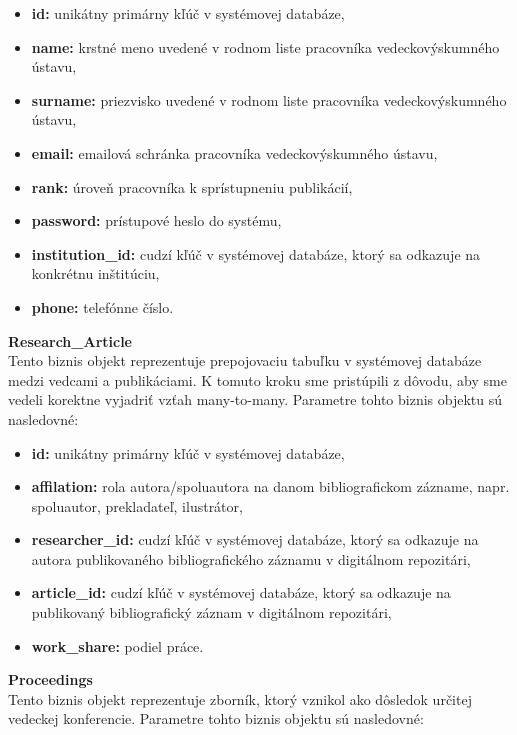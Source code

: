 \documentclass[10pt,oneside,slovak,a4paper]{article}
\begin{document}
\begin{itemize}
\item \textbf{id:} unikátny primárny kľúč v systémovej databáze,
\item \textbf{name:} krstné meno uvedené v rodnom liste pracovníka vedeckovýskumného ústavu,
\item \textbf{surname:} priezvisko uvedené v rodnom liste pracovníka vedeckovýskumného ústavu,
\item \textbf{email:} emailová schránka pracovníka vedeckovýskumného ústavu,
\item \textbf{rank:} úroveň pracovníka k sprístupneniu publikácií,
\item \textbf{password:} prístupové heslo do systému,
\item \textbf{institution\_id:} cudzí kľúč v systémovej databáze, ktorý sa odkazuje na konkrétnu inštitúciu,
\item \textbf{phone:} telefónne číslo.
\end{itemize}

\textbf{Research\_Article}\\
Tento biznis objekt reprezentuje prepojovaciu tabuľku v systémovej databáze medzi vedcami a publikáciami. K tomuto kroku sme pristúpili z dôvodu, aby sme vedeli korektne vyjadriť vzťah many-to-many. Parametre tohto biznis objektu sú nasledovné:

\begin{itemize}
\item \textbf{id:} unikátny primárny kľúč v systémovej databáze,
\item \textbf{affilation:} rola autora/spoluautora na danom bibliografickom zázname, napr. spoluautor, prekladateľ, ilustrátor,
\item \textbf{researcher\_id:} cudzí kľúč v systémovej databáze, ktorý sa odkazuje na autora publikovaného bibliografického záznamu v digitálnom repozitári,
\item \textbf{article\_id:} cudzí kľúč v systémovej databáze, ktorý sa odkazuje na publikovaný bibliografický záznam v digitálnom repozitári,
\item \textbf{work\_share:} podiel práce.
\end{itemize}

\textbf{Proceedings}\\
Tento biznis objekt reprezentuje zborník, ktorý vznikol ako dôsledok určitej vedeckej konferencie. Parametre tohto biznis objektu sú nasledovné:
\end{document}
